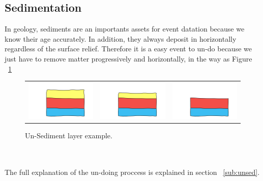 \documentclass[12pt, a4paper]{report} %
\begin{document}
\subsection{Sedimentation}
In geology, sediments are an importants assets for event datation because we know their age accurately. In addition, they always deposit in horizontally regardless of the surface relief. Therefore it is a easy event to un-do because we just have to remove matter progressively and horizontally, in the way as Figure ~\ref{unsedeg}
\begin{figure}[H]
\centering
\begin{tabular}{@{}ccc@{}}
\includegraphics[width=.35\textwidth]{unSedimentDescription0.png}&
\includegraphics[width=.35\textwidth]{unSedimentDescription1.png}&
\includegraphics[width=.35\textwidth]{unSedimentDescription2.png}\\
\end{tabular}
\caption{Un-Sediment layer example.}
\label{unsedeg}
\end{figure}\\\\
The full explanation of the un-doing proccess is explained in section ~\ref{sub:unsed}.
\end{document}
